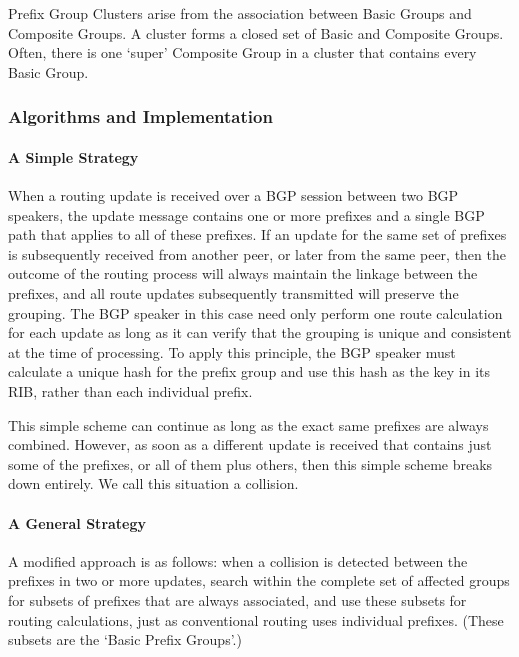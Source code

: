 Prefix Group Clusters arise from the association between Basic Groups and Composite Groups. A cluster forms a closed set of Basic and Composite Groups. Often, there is one `super' Composite Group in a cluster that contains every Basic Group.

\bigskip

\subsubsection{Algorithms and Implementation}

\paragraph{A Simple Strategy}

When a routing update is received over a BGP session between two BGP speakers, the update message contains one or more prefixes and a single BGP path that applies to all of these prefixes. If an update for the same set of prefixes is subsequently received from another peer, or later from the same peer, then the outcome of the routing process will always maintain the linkage between the prefixes, and all route updates subsequently transmitted will preserve the grouping. The BGP speaker in this case need only perform one route calculation for each update as long as it can verify that the grouping is unique and consistent at the time of processing. To apply this principle, the BGP speaker must calculate a unique hash for the prefix group and use this hash as the key in its RIB, rather than each individual prefix.

This simple scheme can continue as long as the exact same prefixes are always combined. However, as soon as a different update is received that contains just some of the prefixes, or all of them plus others, then this simple scheme breaks down entirely. We call this situation a collision.

\paragraph{A General Strategy}

A modified approach is as follows: when a collision is detected between the prefixes in two or more updates, search within the complete set of affected groups for subsets of prefixes that are always associated, and use these subsets for routing calculations, just as conventional routing uses individual prefixes. (These subsets are the `Basic Prefix Groups'.)

